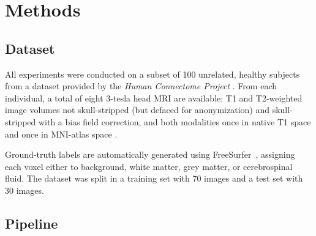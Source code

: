 \documentclass[journal]{IEEEtran}
\begin{document}
\section{Methods}

\subsection{Dataset}
All experiments were conducted on a subset of 100 unrelated, healthy subjects from a dataset provided by the \textit{Human Connectome Project} \cite{van2013wu}. From each individual, a total of eight 3-tesla head MRI are available: T1 and T2-weighted image volumes not skull-stripped (but defaced for anonymization) and skull-stripped with a bias field correction, and both modalities once in native T1 space and once in MNI-atlas space \cite{mazziotta2001probabilistic}.

Ground-truth labels are automatically generated using FreeSurfer~\cite{fischl2012freesurfer}, assigning each voxel either to background, white matter, grey matter, or cerebrospinal fluid. The dataset was split in a training set with 70 images and a test set with 30 images.

\subsection{Pipeline}\label{s.pipeline}
\end{document}
